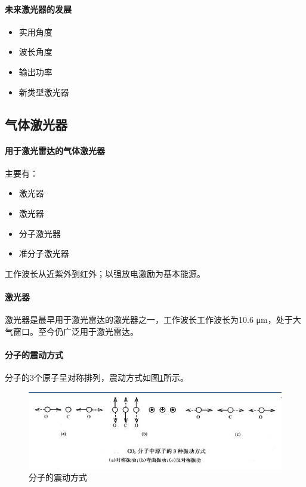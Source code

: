 \paragraph{未来激光器的发展}
\begin{itemize}
	\item 实用角度
	\item 波长角度
	\item 输出功率
	\item 新类型激光器
\end{itemize}

\subsection{气体激光器} %
\paragraph{用于激光雷达的气体激光器}主要有：\begin{itemize}
	\item {}激光器
	\item {}激光器
	\item {}分子激光器
	\item 准分子激光器
\end{itemize}

工作波长从近紫外到红外；以强放电激励为基本能源。

\paragraph{激光器}激光器是最早用于激光雷达的激光器之一，工作波长工作波长为10.6 μm，处于大气窗口。至今仍广泛用于激光雷达。

\paragraph{分子的震动方式}分子的3个原子呈对称排列，震动方式如图\ref{fig:CO2分子的震动方式}所示。
\begin{figure}[htbp]
	\centering
	\includegraphics[width=\linewidth]{figure/Chapter2/CO2分子的震动方式}
	\caption{分子的震动方式}
	\label{fig:CO2分子的震动方式}
\end{figure}

